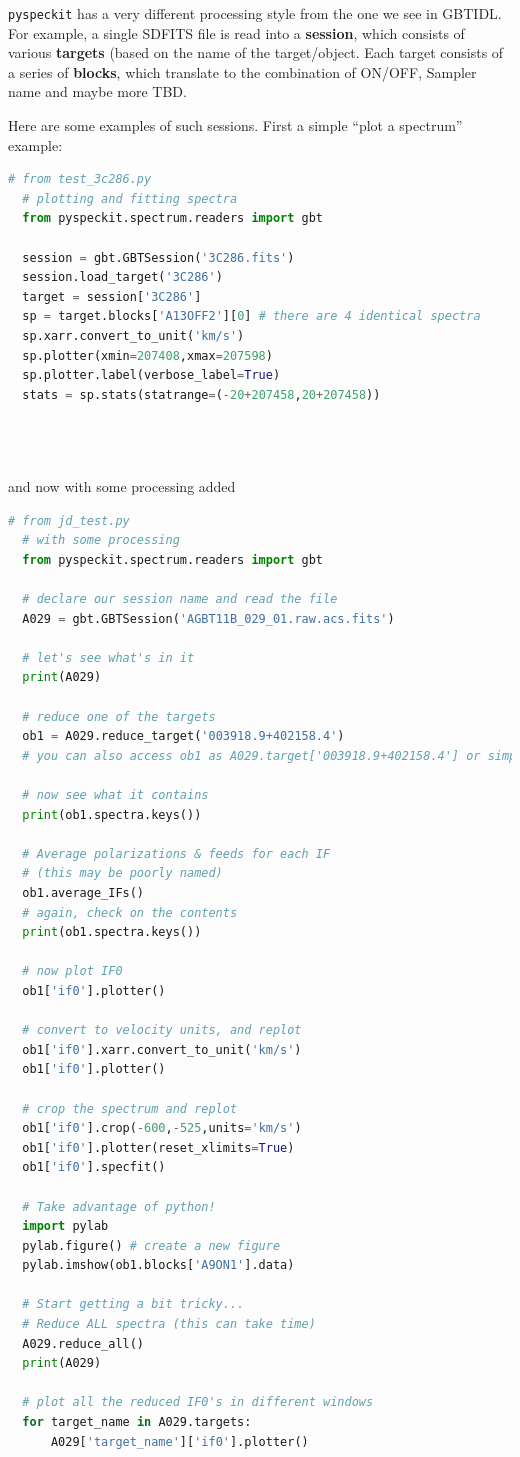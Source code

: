 \documentclass[12pt,a4paper]{article}
\begin{document}
{\tt pyspeckit} has a very different processing style from the one we
see in GBTIDL. For example, a single SDFITS file is read into a
{\bf  session}, which consists of various {\bf targets} (based on the name
of the target/object. Each target consists of a series of {\bf blocks},
which translate to the combination of ON/OFF, Sampler
name and maybe more TBD.

Here are some examples of such sessions. First
a simple ``plot a spectrum'' example:

\footnotesize
\begin{lstlisting}[language=python]
  # from test_3c286.py
  # plotting and fitting spectra
  from pyspeckit.spectrum.readers import gbt
  
  session = gbt.GBTSession('3C286.fits')
  session.load_target('3C286')
  target = session['3C286']
  sp = target.blocks['A13OFF2'][0] # there are 4 identical spectra
  sp.xarr.convert_to_unit('km/s')
  sp.plotter(xmin=207408,xmax=207598)
  sp.plotter.label(verbose_label=True)
  stats = sp.stats(statrange=(-20+207458,20+207458))


  
\end{lstlisting}
\normalsize

and now with some processing added

\footnotesize
\begin{lstlisting}[language=python]
  # from jd_test.py
  # with some processing
  from pyspeckit.spectrum.readers import gbt
  
  # declare our session name and read the file
  A029 = gbt.GBTSession('AGBT11B_029_01.raw.acs.fits')

  # let's see what's in it
  print(A029)

  # reduce one of the targets
  ob1 = A029.reduce_target('003918.9+402158.4')
  # you can also access ob1 as A029.target['003918.9+402158.4'] or simply A029['003918.9+402158.4']

  # now see what it contains
  print(ob1.spectra.keys())

  # Average polarizations & feeds for each IF
  # (this may be poorly named)
  ob1.average_IFs()
  # again, check on the contents
  print(ob1.spectra.keys())
  
  # now plot IF0
  ob1['if0'].plotter()
  
  # convert to velocity units, and replot
  ob1['if0'].xarr.convert_to_unit('km/s')
  ob1['if0'].plotter()
  
  # crop the spectrum and replot
  ob1['if0'].crop(-600,-525,units='km/s')
  ob1['if0'].plotter(reset_xlimits=True)
  ob1['if0'].specfit()
  
  # Take advantage of python!
  import pylab
  pylab.figure() # create a new figure
  pylab.imshow(ob1.blocks['A9ON1'].data)
  
  # Start getting a bit tricky...
  # Reduce ALL spectra (this can take time)
  A029.reduce_all()
  print(A029)
  
  # plot all the reduced IF0's in different windows
  for target_name in A029.targets:
      A029['target_name']['if0'].plotter()

  
\end{lstlisting}
\normalsize
\end{document}
